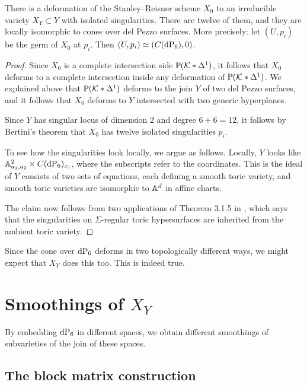 \begin{proposition}
There is a deformation of the Stanley--Reisner scheme $X_0$ to an irreducible \CY variety $X_Y \subset Y$ with isolated singularities. There are twelve of them, and they are locally isomorphic to cones over del Pezzo surfaces. More precisely: let $(U,p_i)$ be the germ of $X_0$ at $p_i$. Then $(U,p_i) \simeq (C(\dP6),0)$.
\end{proposition}
\begin{proof}
Since $X_0$ is a complete intersection side $\mathbb{P}(\mathcal{K} \ast \Delta^1)$, it follows that $X_0$ deforms to a complete intersection inside any deformation of $\mathbb{P}(\mathcal{K} \ast \Delta^1)$. We explained above that $\mathbb{P}(\mathcal{K} \ast \Delta^1)$ deforms to the join $Y$ of two del Pezzo surfaces, and it follows that $X_0$ deforms to $Y$ intersected with two generic hyperplanes.

Since $Y$ has singular locus of dimension $2$ and degree $6+6=12$, it follows by Bertini's theorem \cite[Chapter II, Theorem 8.18]{hartshorne} that $X_0$ has twelve isolated singularities $p_i$.

To see how the singularities look locally, we argue as follows. Locally, $Y$ looks like $\A^2_{a_1,a_2} \times C(\dP6)_{x_i}$, where the subscripts refer to the coordinates. This is the ideal of $Y$ consists of two sets of equations, each defining a smooth toric variety, and smooth toric varieties are isomorphic to $\mathbb{A}^d$ in affine  charts.

The claim now follows from two applications of Theorem 3.1.5 in \cite{batyrev_mirrorsymmetry}, which says that the singularities on $\Sigma$-regular toric hypersurfaces are inherited from the ambient toric variety.
\end{proof}

Since the cone over $\dP6$ deforms in two topologically different ways, we might expect that $X_Y$ does this too. This is indeed true.


\section[Smoothings of XY]{Smoothings of $X_Y$}

By embedding $\dP6$ in different spaces, we obtain different smoothings of subvarieties of the join of these spaces.

\subsection{The block matrix construction}


